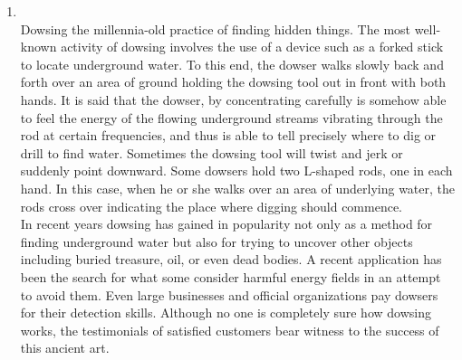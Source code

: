 \documentclass[12pt]{article}
\begin{document}
\begin{enumerate}
      The most blatant from of plagiarism is reproducing someone else's sentences, more or less verbatim, and presenting them as your own. Other forms include repeating another's particularly apt phrase without appropriate acknowledgement, paraphrasing someone else's argument as your own, introducing another's line of thinking as your own development of an idea, and failing to cite the source for a borrowed thesis or approach. Plagiarism falls outside the scope of copyright infringement. Copyright infringement, in contrast, is using the work of a copyrighted work beyond the limit of fair use without the permission of the owner of copyright law are not plagiarism. The penalties of plagiarism can be severe, ranging from loss of respect to loss of degrees, tenure or even employment. At all stages research and writing, you must guard against the possibilities of inadvertent plagiarism by keeping careful notes that distinguish between your own musings and thoughts and material you gather from others.\\

      Even without considering the penalties of plagiarism, the best scholars generously acknowledge their debts to others. By doing so they not only contribute to the historiography of scholarship but also help younger scholars understand the process of research and discovery.

    \item {}\\
      Dowsing the millennia-old practice of finding hidden things. The most well-known activity of dowsing involves the use of a device such as a forked stick to locate underground water. To this end, the dowser walks slowly back and forth over an area of ground holding the dowsing tool out in front with both hands. It is said that the dowser, by concentrating carefully is somehow able to feel the energy of the flowing underground streams vibrating through the rod at certain frequencies, and thus is able to tell precisely where to dig or drill to find water. Sometimes the dowsing tool will twist and jerk or suddenly point downward. Some dowsers hold two L-shaped rods, one in each hand. In this case, when he or she walks over an area of underlying water, the rods cross over indicating the place where digging should commence.\\

      In recent years dowsing has gained in popularity not only as a method for finding underground water but also for trying to uncover other objects including buried treasure, oil, or even dead bodies. A recent application has been the search for what some consider harmful energy fields in an attempt to avoid them. Even large businesses and official organizations pay dowsers for their detection skills. Although no one is completely sure how dowsing works, the testimonials of satisfied customers bear witness to the success of this ancient art.


\end{enumerate}
\end{document}
